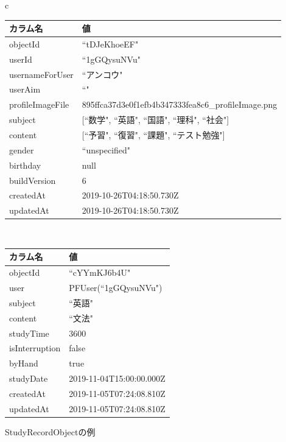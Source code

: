 \begin{figure}[htb]
\begin{center}
\begin{tabular}{c}

\begin{minipage}[htb]{\linewidth}
\begin{center}
  \begin{tabular}{|l|l|} \hline
    カラム名 & 値 \\ \hline
    objectId & ``tDJeKhoeEF" \\
    userId & ``1gGQysuNVu" \\
    usernameForUser & ``アンコウ" \\
    userAim & ``" \\
    profileImageFile & 895ffca37d3e0f1efb4b347333fea8c6\_profileImage.png \\
    subject & [``数学", ``英語", ``国語", ``理科", ``社会"] \\
    content & [``予習", ``復習", ``課題", ``テスト勉強"] \\
    gender & ``unspecified" \\
    birthday & null \\
    buildVersion & 6 \\
	createdAt & 2019-10-26T04:18:50.730Z \\
	updatedAt & 2019-10-26T04:18:50.730Z \\ \hline
  \end{tabular}
  \caption{UserInformationObjectの例}
  \label{tb:user_information_object}
\end{center}
\end{minipage}

\\

\begin{minipage}[htb]{0.5\linewidth}
\begin{center}
  \begin{tabular}{|l|l|} \hline
    カラム名 & 値 \\ \hline
    objectId & ``cYYmKJ6b4U" \\
    user & PFUser(``1gGQysuNVu") \\
    subject & ``英語" \\ 
    content & ``文法" \\ 
	studyTime & 3600 \\ 
	isInterruption & false \\ 
	byHand & true \\  
	studyDate & 2019-11-04T15:00:00.000Z \\
	createdAt & 2019-11-05T07:24:08.810Z \\
	updatedAt & 2019-11-05T07:24:08.810Z \\ \hline
  \end{tabular}
  \caption{StudyRecordObjectの例}
  \label{tb:study_record_object}
\end{center}
\end{minipage}


\end{tabular}
\end{center}
\end{figure}
